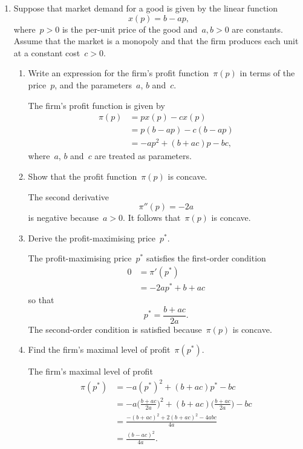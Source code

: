 
\begin{enumerate}

	\item
	Suppose that market demand for a good is given by the linear function
	\[ x(p)=b-ap, \]
	where~$p>0$ is the per-unit price of the good and~$a,b>0$ are constants.
	Assume that the market is a monopoly and that the firm produces each unit at a constant cost~$c>0$.
	\begin{enumerate}

		\item
		Write an expression for the firm's profit function~$\pi(p)$ in terms of the price~$p$, and the parameters~$a$, $b$ and~$c$.
		\begin{solution}
			The firm's profit function is given by
			\begin{align}
				\pi(p)
				&= px(p)-cx(p)\\
				&= p(b-ap)-c(b-ap)\\
				&= -ap^2+(b+ac)p-bc,
			\end{align}
			where~$a$, $b$ and~$c$ are treated as parameters.
		\end{solution}

		\item
		Show that the profit function~$\pi(p)$ is concave.
		\begin{solution}
			The second derivative
			\[ \pi''(p)=-2a \]
			is negative because~$a>0$.
			It follows that~$\pi(p)$ is concave.
		\end{solution}

		\item
		Derive the profit-maximising price~$p^*$.
		\begin{solution}
			The profit-maximising price~$p^*$ satisfies the first-order condition
			\begin{align}
				0
				&= \pi'(p^*)\\
				&= -2ap^*+b+ac
			\end{align}
			so that
			\[ p^*=\frac{b+ac}{2a}. \]
			The second-order condition is satisfied because~$\pi(p)$ is concave.
		\end{solution}

		\item
		Find the firm's maximal level of profit~$\pi(p^*)$.
		\begin{solution}
			The firm's maximal level of profit
			\begin{align}
				\pi(p^*)
				&= -a(p^*)^2+(b+ac)p^*-bc\\
				&= -a\bigg(\frac{b+ac}{2a}\bigg)^2%
					+(b+ac)\bigg(\frac{b+ac}{2a}\bigg)%
					-bc\\
				&= \frac{-(b+ac)^2+2(b+ac)^2-4abc}{4a}\\
				&= \frac{(b-ac)^2}{4a}.
			\end{align}
		\end{solution}


\end{enumerate}
\end{enumerate}
